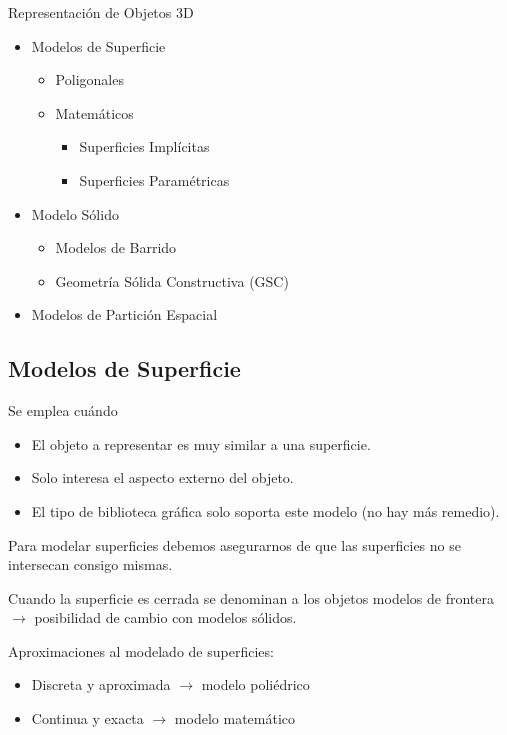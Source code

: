 Representación de Objetos 3D
\begin{itemize}
    \item Modelos de Superficie
    \begin{itemize}
        \item Poligonales
        \item Matemáticos
        \begin{itemize}
            \item Superficies Implícitas
            \item Superficies Paramétricas
        \end{itemize}
    \end{itemize}
    \item Modelo Sólido
    \begin{itemize}
        \item Modelos de Barrido
        \item Geometría Sólida Constructiva (GSC)
    \end{itemize}
    \item Modelos de Partición Espacial
\end{itemize}

\subsection{Modelos de Superficie}
Se emplea cuándo
\begin{itemize}
    \item El objeto a representar es muy similar a una superficie.
    \item Solo interesa el aspecto externo del objeto.
    \item El tipo de biblioteca gráfica solo soporta este modelo (no hay más remedio).
\end{itemize}

Para modelar superficies debemos asegurarnos de que las superficies no se intersecan consigo mismas.

Cuando la superficie es cerrada se denominan a los objetos modelos de frontera $\rightarrow$ posibilidad de cambio con modelos sólidos.

Aproximaciones al modelado de superficies:
\begin{itemize}
    \item Discreta y aproximada $\rightarrow$ modelo poliédrico
    \item Continua y exacta $\rightarrow$ modelo matemático
\end{itemize}

